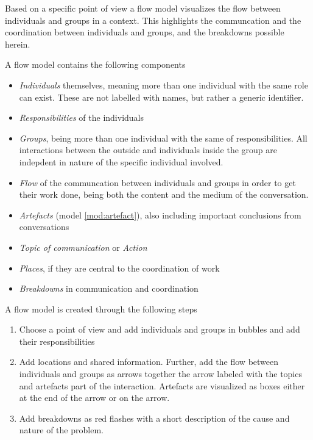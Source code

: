 \begin{model} \label{mod:flow_model} 
  Based on a specific point of view a flow model visualizes the flow between individuals and groups in a context. This highlights the communcation and the coordination between individuals and groups, and the breakdowns possible herein. \cite[p. 278]{benyon_10}
  
  A flow model contains the following components \cite[p. 278-279]{benyon_10}
  \begin{itemize}
  	\item \emph{Individuals} themselves, meaning more than one individual with the same role can exist. These are not labelled with names, but rather a generic identifier.
  	\item \emph{Responsibilities} of the individuals
  	\item \emph{Groups}, being more than one individual with the same of responsibilities. All interactions between the outside and individuals inside the group are indepdent in nature of the specific individual involved.
  	\item \emph{Flow} of the communcation between individuals and groups in order to get their work done, being both the content and the medium of the conversation.
  	\item \emph{Artefacts} (model \ref{mod:artefact}), also including important conclusions from conversations
  	\item \emph{Topic of communication} or \emph{Action}
  	\item \emph{Places}, if they are central to the coordination of work
  	\item \emph{Breakdowns} in communication and coordination
  \end{itemize}
  A flow model is created through the following steps \cite[p. 279-281]{benyon_10}
  \begin{enumerate}
  	\item Choose a point of view and add individuals and groups in bubbles and add their responsibilities
  	\item Add locations and shared information. Further, add the flow between individuals and groups as arrows together the arrow labeled with the topics and artefacts part of the interaction. Artefacts are visualized as boxes either at the end of the arrow or on the arrow.
  	\item Add breakdowns as red flashes with a short description of the cause and nature of the problem.
  \end{enumerate}
\end{model}
